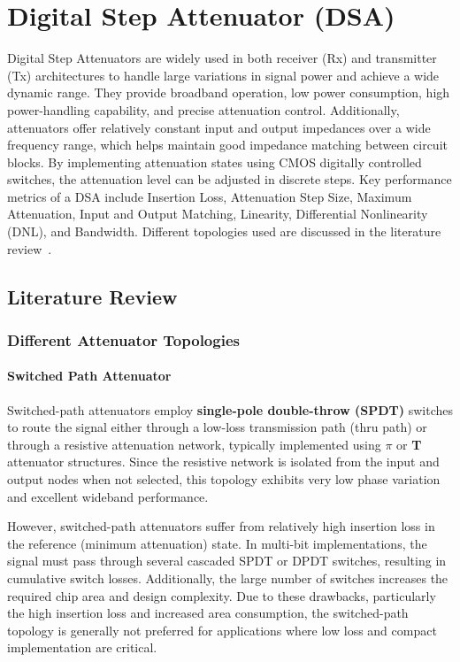 
\chapter{Digital Step Attenuator (DSA)}
\label{ch:dsa}
\raggedbottom

Digital Step Attenuators are widely used in both receiver (Rx) and transmitter (Tx) architectures to handle large variations in signal power and achieve a wide dynamic range. They provide broadband operation, low power consumption, high power-handling capability, and precise attenuation control. Additionally, attenuators offer relatively constant input and output impedances over a wide frequency range, which helps maintain good impedance matching between circuit blocks. By implementing attenuation states using CMOS digitally controlled switches, the attenuation level can be adjusted in discrete steps. Key performance metrics of a DSA include Insertion Loss, Attenuation Step Size, Maximum Attenuation, Input and Output Matching, Linearity, Differential Nonlinearity (DNL), and Bandwidth. Different topologies used are discussed in the literature review~\cite{4639533,8354931}.

\section{Literature Review}
\label{sec:lit_review}

\subsection{Different Attenuator Topologies}
\label{subsec:topologies}

\subsubsection{Switched Path Attenuator}
\label{subsubsec:switched_path}

Switched-path attenuators employ \textbf{single-pole double-throw (SPDT)} switches to route the signal either through a low-loss transmission path (thru path) or through a resistive attenuation network, typically implemented using \textbf{$\pi$} or \textbf{T} attenuator structures. Since the resistive network is isolated from the input and output nodes when not selected, this topology exhibits very low phase variation and excellent wideband performance.

However, switched-path attenuators suffer from relatively high insertion loss in the reference (minimum attenuation) state. In multi-bit implementations, the signal must pass through several cascaded SPDT or DPDT switches, resulting in cumulative switch losses. Additionally, the large number of switches increases the required chip area and design complexity. Due to these drawbacks, particularly the high insertion loss and increased area consumption, the switched-path topology is generally not preferred for applications where low loss and compact implementation are critical.


